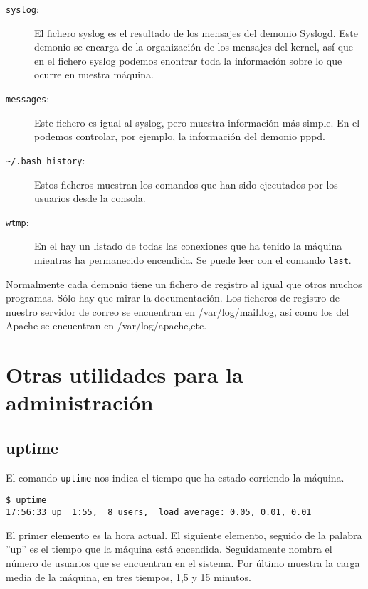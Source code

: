 \begin{description}

\item [{\tt syslog}:] El fichero syslog es  el resultado de los mensajes del
demonio Syslogd.  Este demonio  se encarga de  la organización  de los
mensajes del  kernel, así  que en el  fichero syslog  podemos enontrar
toda la información sobre lo que ocurre en nuestra máquina.

\item  [{\tt messages}:]  Este fichero  es  igual  al syslog,  pero  muestra
información  más simple.  En  el podemos  controlar,  por ejemplo,  la
información del demonio pppd.

\item [{\tt \~{}/.bash\_history}:] Estos  ficheros muestran los comandos
que han sido ejecutados por los usuarios desde la consola.

\item [{\tt wtmp}:]  En el hay un listado de  todas las conexiones que
ha tenido la máquina mientras  ha permanecido encendida. Se puede leer
con el comando {\tt last}.

\end{description}

Normalmente cada  demonio tiene  un fichero de  registro al  igual que
otros  muchos programas.  Sólo  hay que  mirar  la documentación.  Los
ficheros  de registro  de  nuestro servidor  de  correo se  encuentran
en  /var/log/mail.log,  así  como  los del  Apache  se  encuentran  en
/var/log/apache,etc.

\section{Otras utilidades para la administración}

\subsection*{uptime}
El comando {\tt uptime} nos indica  el tiempo que ha estado corriendo
la máquina.

\begin{verbatim}
$ uptime
17:56:33 up  1:55,  8 users,  load average: 0.05, 0.01, 0.01
\end{verbatim}

El primer elemento  es la hora actual. El  siguiente elemento, seguido
de  la palabra  ''up'' es  el tiempo  que la  máquina está  encendida.
Seguidamente  nombra el  número de  usuarios que  se encuentran  en el
sistema. Por  último muestra  la carga  media de  la máquina,  en tres
tiempos, 1,5 y 15 minutos.

